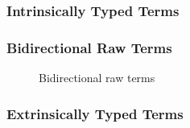 \documentclass[acmsmall]{acmart}
\theoremstyle{acmdefinition}
\begin{document}
\subsubsection{Intrinsically Typed Terms}

\subsubsection{Bidirectional Raw Terms}

\begin{figure}
  \centering
  \small
  \begin{mathpar}
  \end{mathpar}
  
  \caption{Bidirectional raw terms}
\end{figure}

\subsubsection{Extrinsically Typed Terms}
\end{document}
